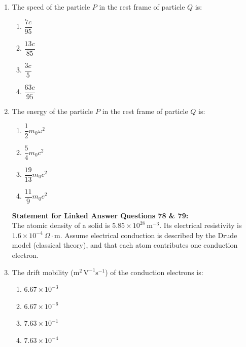 \documentclass[journal,13pt,onecolumn]{IEEEtran}
\begin{document}
\begin{enumerate}[itemsep = 1em]
\item The speed of the particle $P$ in the rest frame of particle $Q$ is:

\hfill{}

\begin{multicols}{4}
\begin{enumerate}
    \item $\dfrac{7c}{95}$
    \item $\dfrac{13c}{85}$
    \item $\dfrac{3c}{5}$
    \item $\dfrac{63c}{95}$
\end{enumerate}
\end{multicols}

\item The energy of the particle $P$ in the rest frame of particle $Q$ is:

\hfill{}

\begin{multicols}{4}
\begin{enumerate}
    \item $\dfrac{1}{2} m_0 \omega^2$
    \item $\dfrac{5}{4} m_0 c^2$
    \item $\dfrac{19}{13} m_0 c^2$
    \item $\dfrac{11}{9} m_0 c^2$
\end{enumerate}
\end{multicols}


\vspace{2em}


\textbf{Statement for Linked Answer Questions 78 \& 79:} \\
The atomic density of a solid is $5.85 \times 10^{28} \ \mathrm{m}^{-3}$. Its electrical resistivity is $1.6 \times 10^{-4} \ \Omega\cdot\mathrm{m}$. Assume electrical conduction is described by the Drude model (classical theory), and that each atom contributes one conduction electron.

\item The drift mobility ($\mathrm{m^2 \, V^{-1} s^{-1}}$) of the conduction electrons is:

\hfill{}

\begin{multicols}{4}
\begin{enumerate}
    \item $6.67 \times 10^{-3}$
    \item $6.67 \times 10^{-6}$
    \item $7.63 \times 10^{-1}$
    \item $7.63 \times 10^{-4}$
\end{enumerate}
\end{multicols}


\end{enumerate}
\end{document}
